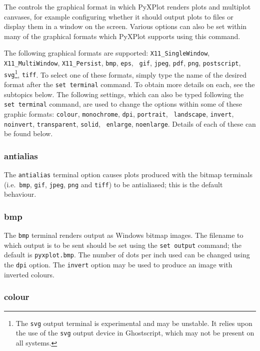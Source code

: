 The  controls the graphical format in which PyXPlot
renders plots and multiplot canvases, for example configuring whether it should
output plots to files or display them in a window on the screen. Various
options can also be set within many of the graphical formats which PyXPlot
supports using this command.

The following graphical formats are supported:  {\tt X11\_\-Single\-Window},
{\tt X11\_\-Multi\-Window}, {\tt X11\_\-Persist}, {\tt bmp}, {\tt eps}, {\tt
gif}, {\tt jpeg}, {\tt pdf}, {\tt png}, {\tt postscript}, {\tt
svg}\footnote{The {\tt svg} output terminal is experimental and may be
unstable. It relies upon the use of the {\tt svg} output device in Ghostscript,
which may not be present on all systems.}, {\tt tiff}.  To select one of these
formats, simply type the name of the desired format after the {\tt set
terminal} command. To obtain more details on each, see the subtopics below.
The following settings, which can also be typed following the {\tt set
terminal} command, are used to change the options within some of these graphic
formats: {\tt colour}, {\tt monochrome}, {\tt dpi}, {\tt portrait}, {\tt
landscape}, {\tt invert}, {\tt noinvert}, {\tt transparent}, {\tt solid}, {\tt
enlarge}, {\tt noenlarge}. Details of each of these can be found below.


\subsubsection{antialias}

The {\tt antialias} terminal option causes plots produced with the bitmap
terminals (i.e.\ {\tt bmp}, {\tt gif}, {\tt jpeg}, {\tt png} and {\tt tiff}) to be
antialiased; this is the default behaviour.


\subsubsection{bmp}

The {\tt bmp} terminal renders output as Windows bitmap images. The filename to
which output is to be sent should be set using the {\tt set output} command;
the default is {\tt pyxplot.bmp}. The number of dots per inch used can be
changed using the {\tt dpi} option. The {\tt invert} option may be used to produce an
image with inverted colours.


\subsubsection{colour}

